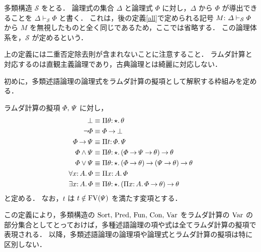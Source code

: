 \documentclass[./main]{subfiles}
\begin{document}
\begin{ziphildefi} \label{mspl}
多類構造 $ \mathscr{S} $ をとる．
論理式の集合 $ \varDelta $ と論理式 $ \varPhi $ に対し，$ \varDelta $ から $ \varPhi $ が導出できることを $ \varDelta \vdash _{\mathscr{S}} \varPhi $ と書く．
これは，後の定義\ref{all}で定められる記号 $ M \mathpunct{:}\, \varDelta \vdash _{\mathcal{S}} \varPhi $ から $ M $ を無視したものと全く同じであるため，ここでは省略する．
この論理体系を，$ \mathscr{S} $ が定めるという．
\end{ziphildefi}

上の定義には二重否定除去則が含まれないことに注意すること．
ラムダ計算と対応するのは直観主義論理であり，古典論理とは綺麗に対応しない．



初めに，多類述語論理の論理式をラムダ計算の擬項として解釈する枠組みを定める．

\begin{ziphildefi}
ラムダ計算の擬項 $ \varPhi,\, \varPsi $ に対し，
\begin{align*}
\bot & \equiv \Pi \theta \mathord{:}\, \mathord{\star}.\, \theta \\
\lnot \varPhi & \equiv \varPhi \mathbin{\to} \bot \\
\varPhi \mathbin{\to} \varPsi & \equiv \Pi t \mathord{:}\, \varPhi.\, \varPsi \\
\varPhi \land \varPsi & \equiv \Pi \theta \mathord{:}\, \mathord{\star}.\, (\varPhi \mathbin{\to} \varPsi \mathbin{\to} \theta) \mathbin{\to} \theta \\
\varPhi \lor \varPsi & \equiv \Pi \theta \mathord{:}\, \mathord{\star}.\, (\varPhi \mathbin{\to} \theta) \mathbin{\to} (\varPsi \mathbin{\to} \theta) \mathbin{\to} \theta \\
\forall x \mathord{:}\, A.\, \varPhi & \equiv \Pi x \mathord{:}\, A.\, \varPhi \\
\exists x \mathord{:}\, A.\, \varPhi & \equiv \Pi \theta \mathord{:}\, \mathord{\star}.\, (\Pi x \mathord{:}\, A.\, \varPhi \mathbin{\to} \theta) \mathbin{\to} \theta
\end{align*}
と定める．
なお，$ t $ は $ t \notin \mathop{\mathrm{FV}}\nolimits (\varPsi) $ を満たす変項とする．
\end{ziphildefi}

この定義により，多類構造の $ \mathop{\mathrm{Sort}}\nolimits,\, \mathop{\mathrm{Pred}}\nolimits,\, \mathop{\mathrm{Fun}}\nolimits,\, \mathop{\mathrm{Con}}\nolimits,\, \mathop{\mathrm{Var}}\nolimits $ をラムダ計算の $ \mathop{\mathrm{Var}}\nolimits $ の部分集合としてとっておけば，多種述語論理の項や式は全てラムダ計算の擬項で表現される．
以降，多類述語論理の論理項や論理式とラムダ計算の擬項は特に区別しない．
\end{document}
